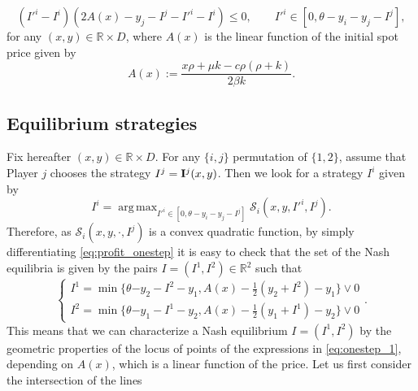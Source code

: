 \documentclass[10pt]{article}
\numberwithin{equation}{section}
\theoremstyle{plain}
\numberwithin{theorem}{section}
\theoremstyle{definition}
\newcommand{\ndel}[1]{{\color{blue}\xout{#1}} }
\def \R {\mathbb{R}}
\newcommand{\<}{\langle}
\renewcommand{\>}{\rangle}
\renewcommand{\(}{\left(}
\renewcommand{\)}{\right)}
\def \R  {{\mathbb {R}}}
\def \R {{\mathbb {R}}}
\def\cI{{\mathcal I}}
\DeclareMathOperator*{\argmax}{arg\,max}
\begin{document}
{{{\begin{equation}\label{Nash_onestep}
(I'^i-I^i)(2A(x)-y_j - I^j-I'^i-I^i)\le 0,  \qquad  I'^i\in [0,\theta-y_i-y_j-I^j],
\end{equation}
for any $(x,y)\in\R\times D$, where $A(x)$ is the linear function of the initial spot price given by
\begin{equation}\label{A(x)}
A(x):=\frac{x\rho+\mu k-c\rho (\rho+k)}{2\beta k}.
\end{equation}}


\subsection{Equilibrium strategies}
{Fix hereafter $(x,y)\in\R\times D$. For any $\{i,j \}$ permutation of $\{1,2\}$, a}ssume that {Player $j$} chooses the %
strategy {$I^j = {\bf I}^j (x,y)$}. Then we look for a strategy $I^i$ given by
\begin{equation} \label{argmax}
I^i = \argmax_{I'^i\in [0,{\theta-y_i-y_j-I^j}]} \mathcal{S}_i(x,y,I'^i,I^j).
\end{equation}
{Therefore, as $\mathcal{S}_i(x,y,\cdot, I^j)$ is a convex quadratic function, by simply differentiating \eqref{eq:profit_onestep}
 it is easy to check that the set of the Nash equilibria is given by the pairs $I=(I^1,I^2)\in\R^2$ such that
\begin{equation}\label{eq:onestep_1}
\begin{cases}
I^1=\min\{\theta{-y_2-I^2}-y_1, A(x)-\frac{1}{2}{(y_2+I^2)}-y_1\}\vee 0\\
I^2=\min\{\theta{-y_1-I^1}-y_2, A(x)-\frac{1}{2}{(y_1+I^1)}-y_2\}\vee 0
\end{cases}.
\end{equation}
}
This means that we can characterize a {Nash equilibrium $I=({I^1},I^2)$} by the geometric properties of the locus of points {of the expressions in} \eqref{eq:onestep_1}, depending on $A(x)$, which is a linear function of the price. Let us first consider the intersection of the lines 
\begin{align}

\end{align}}}
\end{document}
